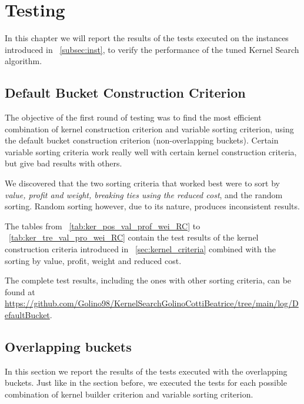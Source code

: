 \chapter{Testing}
In this chapter we will report the results of the tests executed
on the instances introduced in ~\ref{subsec:inst},
to verify the performance of the tuned Kernel Search algorithm.


\section{Default Bucket Construction Criterion}
The objective of the first round of testing was to find the most efficient
combination of kernel construction criterion and variable sorting criterion,
using the default bucket construction criterion (non-overlapping buckets).
Certain variable sorting criteria work really well with certain kernel construction criteria,
but give bad results with others.

We discovered that the two sorting criteria that
worked best were to sort by \textit{value, profit and weight, breaking ties using the reduced cost},
and the random sorting.
Random sorting however, due to its nature, produces inconsistent results.

The tables from ~\ref{tab:ker_pos_val_prof_wei_RC}
to ~\ref{tab:ker_tre_val_pro_wei_RC} contain the test results of the
kernel construction criteria introduced in ~\ref{sec:kernel_criteria}
combined with the sorting by value, profit, weight and reduced cost.

The complete test results, including the ones with other sorting criteria, can be found at
\url{https://github.com/Golino98/KernelSearchGolinoCottiBeatrice/tree/main/log/DefaultBucket}.







\section{Overlapping buckets}
In this section we report the results of the tests executed with the overlapping buckets.
Just like in the section before, we executed the tests for each possible combination
of kernel builder criterion and variable sorting criterion.

